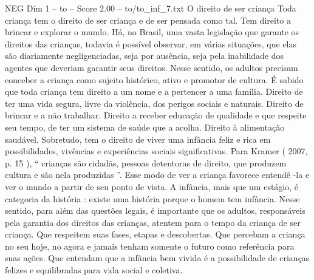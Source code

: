 \begin{textsample}{NEG Dim 1 – to – Score 2.00 – to/to\_inf\_7.txt}  \label{ex:f1_neg_038}
O direito de ser criança Toda criança tem o direito de ser criança e de ser pensada como tal.
Tem direito a brincar e explorar o mundo.
Há, no Brasil, uma vasta legislação que garante os direitos das crianças, todavia é possível observar, em várias situações, que elas são diariamente negligenciadas, seja por ausência, seja pela inabilidade dos agentes que deveriam garantir seus direitos.
Nesse sentido, os adultos precisam conceber a criança como sujeito histórico, ativo e promotor de cultura.
É sabido que toda criança tem direito a um nome e a pertencer a uma família.
Direito de ter uma vida segura, livre da violência, dos perigos sociais e naturais.
Direito de brincar e a não trabalhar.
Direito a receber educação de qualidade e que respeite seu tempo, de ter um sistema de saúde que a acolha.
Direito à alimentação saudável.
Sobretudo, tem o direito de viver uma infância feliz e rica em possibilidades, vivências e experiências sociais significativas.
Para Kramer ( 2007, p. 15 ), “ crianças são cidadãs, pessoas detentoras de direito, que produzem cultura e são nela produzidas ”.
Esse modo de ver a criança favorece entendê -la e ver o mundo a partir de seu ponto de vista.
A infância, mais que um estágio, é categoria da história : existe uma história porque o homem tem infância.
Nesse sentido, para além das questões legais, é importante que os adultos, responsáveis pela garantia dos direitos das crianças, atentem para o tempo da criança de ser criança.
Que respeitem suas fases, etapas e descobertas.
Que percebam a criança no seu hoje, no agora e jamais tenham somente o futuro como referência para suas ações.
Que entendam que a infância bem vivida é a possibilidade de crianças felizes e equilibradas para vida social e coletiva.

\end{textsample}
